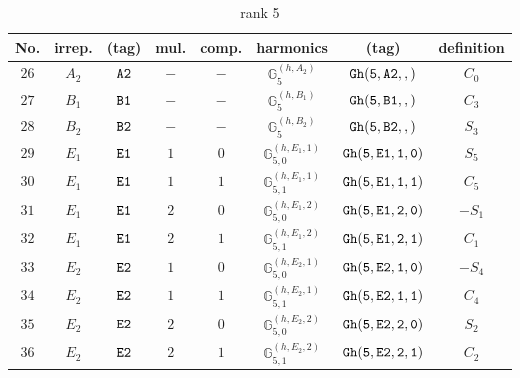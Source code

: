 \documentclass[fleqn,8pt]{jsarticle}
\begin{document}
\begin{table}[ht!]
\begin{center}
\caption{rank 5}
\renewcommand{\arraystretch}{1.3}
\begin{tabular}{cccccccc} \hline \hline
No. & irrep. & (tag) & mul. & comp. & harmonics & (tag) & definition \\ \hline
$ 26 $ & $ A_{2} $ & $ {\tt A2} $ & $ - $ & $ - $ & $ \mathbb{G}_{5}^{(h,A_{2})} $ & $ {\tt Gh(5,A2,,)} $ & $ C_{0} $ \\
$ 27 $ & $ B_{1} $ & $ {\tt B1} $ & $ - $ & $ - $ & $ \mathbb{G}_{5}^{(h,B_{1})} $ & $ {\tt Gh(5,B1,,)} $ & $ C_{3} $ \\
$ 28 $ & $ B_{2} $ & $ {\tt B2} $ & $ - $ & $ - $ & $ \mathbb{G}_{5}^{(h,B_{2})} $ & $ {\tt Gh(5,B2,,)} $ & $ S_{3} $ \\
$ 29 $ & $ E_{1} $ & $ {\tt E1} $ & $ 1 $ & $ 0 $ & $ \mathbb{G}_{5,0}^{(h,E_{1},1)} $ & $ {\tt Gh(5,E1,1,0)} $ & $ S_{5} $ \\
$ 30 $ & $ E_{1} $ & $ {\tt E1} $ & $ 1 $ & $ 1 $ & $ \mathbb{G}_{5,1}^{(h,E_{1},1)} $ & $ {\tt Gh(5,E1,1,1)} $ & $ C_{5} $ \\
$ 31 $ & $ E_{1} $ & $ {\tt E1} $ & $ 2 $ & $ 0 $ & $ \mathbb{G}_{5,0}^{(h,E_{1},2)} $ & $ {\tt Gh(5,E1,2,0)} $ & $ - S_{1} $ \\
$ 32 $ & $ E_{1} $ & $ {\tt E1} $ & $ 2 $ & $ 1 $ & $ \mathbb{G}_{5,1}^{(h,E_{1},2)} $ & $ {\tt Gh(5,E1,2,1)} $ & $ C_{1} $ \\
$ 33 $ & $ E_{2} $ & $ {\tt E2} $ & $ 1 $ & $ 0 $ & $ \mathbb{G}_{5,0}^{(h,E_{2},1)} $ & $ {\tt Gh(5,E2,1,0)} $ & $ - S_{4} $ \\
$ 34 $ & $ E_{2} $ & $ {\tt E2} $ & $ 1 $ & $ 1 $ & $ \mathbb{G}_{5,1}^{(h,E_{2},1)} $ & $ {\tt Gh(5,E2,1,1)} $ & $ C_{4} $ \\
$ 35 $ & $ E_{2} $ & $ {\tt E2} $ & $ 2 $ & $ 0 $ & $ \mathbb{G}_{5,0}^{(h,E_{2},2)} $ & $ {\tt Gh(5,E2,2,0)} $ & $ S_{2} $ \\
$ 36 $ & $ E_{2} $ & $ {\tt E2} $ & $ 2 $ & $ 1 $ & $ \mathbb{G}_{5,1}^{(h,E_{2},2)} $ & $ {\tt Gh(5,E2,2,1)} $ & $ C_{2} $ \\
 \hline \hline
\end{tabular}
\end{center}
\end{table}
\end{document}
